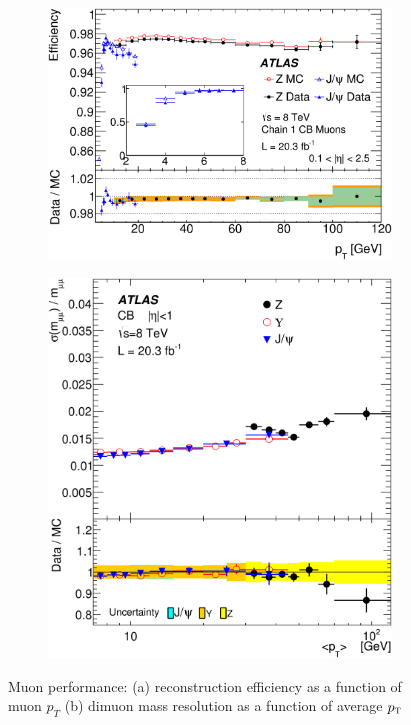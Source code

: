 \begin{figure}[h!]
  \centering
  \captionsetup{justification=centering}

	\begin{subfigure}[t]{0.5\textwidth}
        \centering
        \includegraphics[width=\textwidth]{figures/MuonEff}
        \caption{}
    \end{subfigure}%
    \begin{subfigure}[t]{0.5\textwidth}
        \centering
        \includegraphics[width=\textwidth]{figures/MuonMass}
        \caption{}
    \end{subfigure}

   \caption{Muon performance: (a) reconstruction efficiency as a function of muon $p_{T}$ (b) dimuon mass resolution as a function of average $p_{\textrm{\footnotesize\sc t}}$~\cite{MuonReco}}
  \label{fig:muons}
\end{figure}

